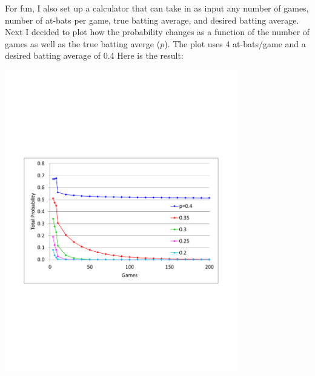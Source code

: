 \documentclass{article}
\begin{document}
For fun, I also set up a calculator that can take in as input any number of games, number of at-bats per game, true batting average, and desired batting average.
Next I decided to plot how the probability changes as a function of the number of games as well as the true batting averge ($p$).
The plot uses 4 at-bats/game and a desired batting average of 0.4
Here is the result:

\begin{center}
\includegraphics[width=4in, trim=0 3in 0 3in, clip]{Batting_probability.pdf}
\end{center}
\end{document}
